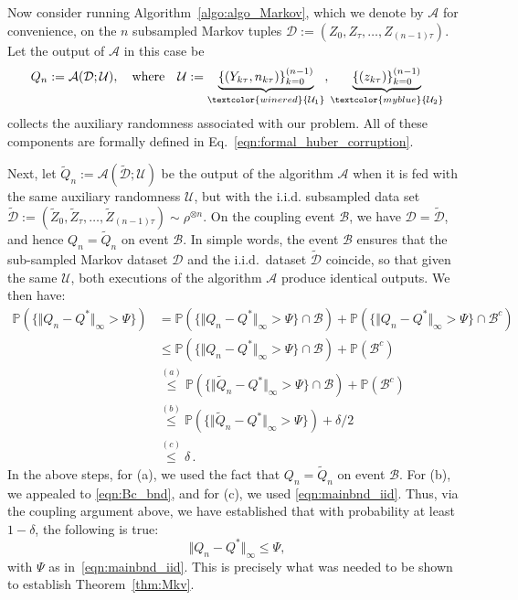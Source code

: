 \documentclass{article}
\newcommand{\mc}{\mathcal}
\begin{document}
Now consider running Algorithm~\ref{algo:algo_Markov}, which we denote by
$\mc{A}$ for convenience, on the $n$ subsampled Markov tuples
\(
\mc{D} := (Z_{0}, Z_{\tau}, \ldots, Z_{(n-1)\tau}).
\)
Let the output of $\mc{A}$ in this case be
\begin{equation}
    Q_n := \mc{A}(\mc{D};\mc{U}), \quad \textrm{where} \quad 
\mc{U} := \underbrace{\{(Y_{k\tau}, n_{k\tau})\}_{k=0}^{(n-1)}}_{\textcolor{winered}{\mc{U}_1}}, \underbrace{\{(z_{k\tau})\}_{k=0}^{(n-1)}}_{\textcolor{myblue}{\mc{U}_2}}
\end{equation}
collects the auxiliary randomness associated with our problem. All of these components are formally defined in Eq.~\eqref{eqn:formal_huber_corruption}. 

Next, let $\tilde Q_n := \mc{A}(\tilde {\mc{D}};\mc{U})$ be the output of the algorithm $\mc{A}$ when it is fed with the same auxiliary randomness $\mc{U}$, but with the i.i.d.  subsampled data set
\(
\tilde {\mc{D}} := (\tilde Z_{0}, \tilde Z_{\tau}, \ldots, \tilde Z_{(n-1)\tau})
\sim \rho^{\otimes n}.
\) On the coupling event $\mc{B}$, we have $\mc{D}=\tilde{\mc{D}}$, and hence $Q_n = \tilde{Q}_n$ on event $\mc{B}$. 
In simple words, the
event $\mc{B}$ ensures that the sub-sampled Markov dataset $\mc{D}$ and the i.i.d.\
dataset $\tilde {\mc{D}}$ coincide, so that given the same $\mc{U}$, both executions of the algorithm \(\mc{A}\) produce identical outputs. We then have: 
\begin{equation}
\begin{aligned}
\mathbb{P}(\{\Vert Q_n - Q^*\Vert_{\infty} > \Psi\}) & = \mathbb{P}(\{\Vert Q_n - Q^*\Vert_{\infty} > \Psi\} \cap \mc{B}) + \mathbb{P}(\{\Vert Q_n - Q^*\Vert_{\infty} > \Psi\} \cap \mc{B}^c)\\
& \leq \mathbb{P}(\{\Vert Q_n - Q^*\Vert_{\infty} > \Psi\} \cap \mc{B}) + \mathbb{P}(\mc{B}^c)\\
&\overset{(a)} \leq \mathbb{P}(\{\Vert \tilde{Q}_n - Q^*\Vert_{\infty} > \Psi\} \cap \mc{B}) + \mathbb{P}(\mc{B}^c)\\
&\overset{(b)} \leq \mathbb{P}(\{\Vert \tilde{Q}_n - Q^*\Vert_{\infty} > \Psi\}) + \delta/2\\
& \overset{(c)} \leq \delta  \, .
\end{aligned}
\end{equation}
In the above steps, for (a), we used the fact that $Q_n =\tilde{Q}_n$ on event $\mc{B}$. For (b), we appealed to \eqref{eqn:Bc_bnd}, and for (c), we used \eqref{eqn:mainbnd_iid}. Thus, via the coupling argument above, we have established that with probability at least $1-\delta$, the following is true:
$$ \Vert Q_n - Q^* \Vert_{\infty} \leq \Psi,$$
with $\Psi$ as in~\eqref{eqn:mainbnd_iid}. This is precisely what was needed to be shown to establish Theorem~\ref{thm:Mkv}.
\newpage
\end{document}
